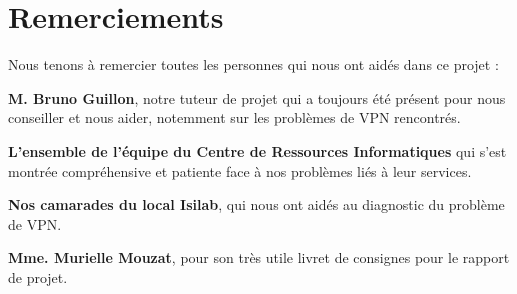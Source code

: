 \section{Remerciements}

Nous tenons à remercier toutes les personnes qui nous ont aidés dans ce projet :

\vspace{10pt}
\textbf{M. Bruno Guillon}, notre tuteur de projet qui a toujours été présent pour nous conseiller et nous aider, notemment sur les problèmes de VPN
rencontrés.

\vspace{10pt}
\textbf{L'ensemble de l'équipe du Centre de Ressources Informatiques} qui s'est montrée compréhensive et patiente face à nos problèmes liés à leur
services.

\vspace{10pt}
\textbf{Nos camarades du local Isilab}, qui nous ont aidés au diagnostic du problème de VPN.

\vspace{10pt}
\textbf{Mme. Murielle Mouzat}, pour son très utile livret de consignes pour le rapport de projet.